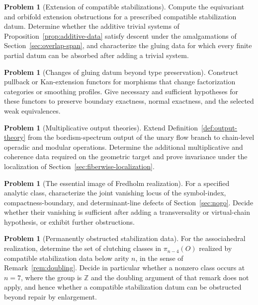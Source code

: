 \documentclass[11pt,letterpaper,twoside]{article}
\theoremstyle{plain}
\theoremstyle{definition}
\newtheorem{problem}[theorem]{Problem}
\theoremstyle{remark}
\begin{document}
\begin{problem}[Extension of compatible stabilizations]\label{prob:stabilization-extension}
Compute the equivariant and orbifold extension obstructions for a prescribed compatible stabilization datum.  Determine whether the additive trivial systems of Proposition~\ref{prop:additive-data} satisfy descent under the amalgamations of Section~\ref{sec:overlap-span}, and characterize the gluing data for which every finite partial datum can be absorbed after adding a trivial system.
\end{problem}

\begin{problem}[Changes of gluing datum beyond type preservation]\label{prob:general-grammar-change}
Construct pullback or Kan-extension functors for morphisms that change factorization categories or smoothing profiles.  Give necessary and sufficient hypotheses for these functors to preserve boundary exactness, normal exactness, and the selected weak equivalences.
\end{problem}

\begin{problem}[Multiplicative output theories]\label{prob:multiplicative-output}
Extend Definition~\ref{def:output-theory} from the bordism-spectrum output of the unary flow branch to chain-level operadic and modular operations.  Determine the additional multiplicative and coherence data required on the geometric target and prove invariance under the localization of Section~\ref{sec:fiberwise-localization}.
\end{problem}

\begin{problem}[The essential image of Fredholm realization]\label{prob:fredholm-image}
For a specified analytic class, characterize the joint vanishing locus of the symbol-index, compactness-boundary, and determinant-line defects of Section~\ref{sec:nogo}.  Decide whether their vanishing is sufficient after adding a transversality or virtual-chain hypothesis, or exhibit further obstructions.
\end{problem}

\begin{problem}[Permanently obstructed stabilization data]\label{prob:arity-seven}
For the associahedral realization, determine the set of clutching classes in \(\pi_{n-4}(O)\) realized by compatible stabilization data below arity \(n\), in the sense of Remark~\ref{rem:doubling}.  Decide in particular whether a nonzero class occurs at \(n=7\), where the group is \(\mathbb Z\) and the doubling argument of that remark does not apply, and hence whether a compatible stabilization datum can be obstructed beyond repair by enlargement.
\end{problem}
\end{document}
